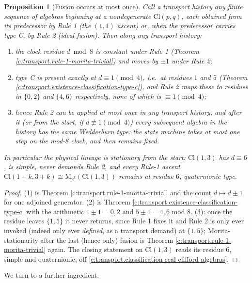 \documentclass[11pt]{article}
\newtheorem{proposition}[theorem]{Proposition}
\theoremstyle{definition}
\theoremstyle{plain}
\newcommand{\changedmark}[2]{\marginpar{\raggedright\scriptsize\color{#1}#2}}
\providecommand{\Cl}{}\renewcommand{\Cl}{\mathrm{Cl}}
\providecommand{\Mat}{}\renewcommand{\Mat}{\mathrm{M}}
\begin{document}
\begin{proposition}[Fusion occurs at most once]\label{c:transport.fusion-occurs-most-once}
\changedmark{gray}{reworded}
Call a \emph{transport history} any finite sequence of algebras beginning at a nondegenerate $\Cl(p,q)$, each obtained from its predecessor by Rule 1 (the $(1,1)$ ascent) or, when the predecessor carries type C, by Rule 2 (ideal fusion). Then along any transport history:
\begin{enumerate}
\item the clock residue $d \bmod 8$ is constant under Rule 1 (Theorem \ref{c:transport.rule-1-morita-trivial}) and moves by $\pm 1$ under Rule 2;
\item type C is present exactly at $d \equiv 1 \pmod 4$, i.e.\ at residues $1$ and $5$ (Theorem \ref{c:transport.existence-classification-type-c}), and Rule 2 maps these to residues in $\{0, 2\}$ and $\{4, 6\}$ respectively, none of which is $\equiv 1 \pmod 4$;
\item hence Rule 2 can be applied at most once in any transport history, and after it (or from the start, if $d \not\equiv 1 \pmod 4$) every subsequent algebra in the history has the same Wedderburn type: the state machine takes at most one step on the mod-8 clock, and then remains fixed.
\end{enumerate}
In particular the physical lineage is stationary from the start: $\Cl(1,3)$ has $d \equiv 6$, is simple, never demands Rule 2, and every Rule-1 ascent $\Cl(1{+}k, 3{+}k) \cong \Mat_{2^k}(\Cl(1,3))$ remains at residue $6$, quaternionic type.
\end{proposition}
\begin{proof}
(1) is Theorem \ref{c:transport.rule-1-morita-trivial} and the count $d \mapsto d \pm 1$ for one adjoined generator. (2) is Theorem \ref{c:transport.existence-classification-type-c} with the arithmetic $1 \pm 1 = 0, 2$ and $5 \pm 1 = 4, 6$ mod $8$. (3): once the residue leaves $\{1, 5\}$ it never returns, since Rule 1 fixes it and Rule 2 is only ever invoked (indeed only ever \emph{defined}, as a transport demand) at $\{1,5\}$; Morita-stationarity after the last (hence only) fusion is Theorem \ref{c:transport.rule-1-morita-trivial} again. The closing statement on $\Cl(1,3)$ reads its residue $6$, simple and quaternionic, off \ref{c:transport.classification-real-clifford-algebras}.

\end{proof}

We turn to a further ingredient.
\end{document}
